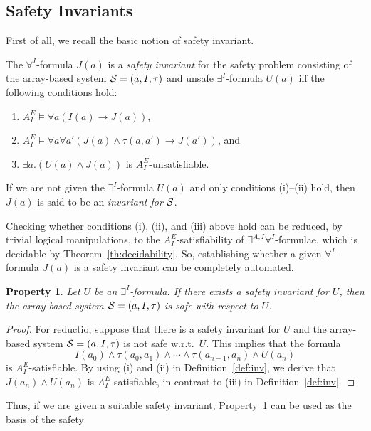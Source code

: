 \documentclass{LMCS}
\newcommand{\cSi}{\ensuremath \mathcal S}
\theoremstyle{plain}\newtheorem{assumption}[thm]{Assumption}
\theoremstyle{plain}\newtheorem{proposition}[thm]{Proposition}
\theoremstyle{plain}\newtheorem{property}[thm]{Property}
\theoremstyle{plain}\newtheorem{example}[thm]{Example}
\theoremstyle{plain}\newtheorem{claim}[thm]{Claim}
\theoremstyle{plain}\newtheorem{lemma}[thm]{Lemma}
\begin{document}
\subsection{Safety Invariants}
\label{subsec:dec+inv}
First of all, we recall the basic notion of safety invariant.
\begin{defi}
  \label{def:inv}
  The $\forall^I$-formula $J(a)$ is a \emph{safety invariant} for the
  safety problem consisting of the array-based system
  $\cSi=(a,I,\tau)$ and unsafe $\exists^I$-formula $U(a)$ iff the following
  conditions hold:
  \begin{enumerate}[{\rm (i)}]
    \item $A^E_I\models \forall a (I(a)\to J(a))$,
    \item $A^E_I\models \forall a\forall a' (J(a)\wedge \tau(a, a')\to
      J(a'))$, and
    \item $\exists a.(U(a)\wedge J(a))$ is $A_I^E$-unsatisfiable.
  \end{enumerate}
  If we are not given the $\exists^I$-formula $U(a)$ and only conditions
  (i)--(ii) hold, then $J(a)$ is said to be an \emph{invariant for $\cSi$}.
\end{defi}
Checking whether conditions (i), (ii), and (iii) above hold can be
reduced, by trivial logical manipulations, to the
$A_I^E$-satisfiability of $\exists^{A,I}\forall^I$-formulae, which is
decidable by Theorem~\ref{th:decidability}.  So, establishing whether
a given $\forall^I$-formula $J(a)$ is a safety invariant can be
completely automated.
\begin{property}
  \label{prop:inv-method}
  Let $U$ be an $\exists^I$-formula.  If there exists a safety
  invariant for $U$, then the array-based system $\cSi=(a,I,\tau)$ is
  safe with respect to $U$.
\end{property}
\begin{proof}
  For reductio, suppose that there is a safety invariant for $U$ and
  the array-based system $\cSi=(a,I,\tau)$ is not safe w.r.t.\ $U$.
  This implies that the formula
  \begin{equation}
    I(a_0)\wedge \tau(a_0, a_1)\wedge \cdots \wedge \tau(a_{n-1},
    a_n)\wedge U(a_n)
  \end{equation}
  is $A^E_I$-satisfiable. By using (i) and (ii) in
  Definition~\ref{def:inv}, we derive that $J(a_n)\wedge U(a_n)$ is
  $A^E_I$-satisfiable, in contrast to (iii) in
  Definition~\ref{def:inv}.
\end{proof}
Thus, if we are given a suitable safety invariant,
Property~\ref{prop:inv-method} can be used as the basis of the safety
\end{document}
